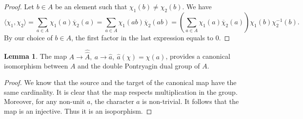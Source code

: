 \documentclass[11pt]{amsart}
\theoremstyle{definition}
\newtheorem{lem}[defi]{Lemma}
\begin{document}
\begin{proof}
    Let $b\in A$ be an element such that $\chi_1(b)\ne\chi_2(b)$. We have
    $$\langle \chi_1,\chi_2\rangle=\sum_{a\in A}\chi_1(a)\overline \chi_2(a)=
    \sum_{a\in A}\chi_1(ab)\overline \chi_2(ab)=(\sum_{a\in A}\chi_1(a)\overline \chi_2(a))\chi_1(b)\chi_2^{-1}(b). 
    $$
    By our choice of $b\in A$, the first factor in the last expression equals to $0$.
\end{proof}
\begin{lem}
The map $A\to \hat{\hat{A}},\ a\to \hat{a},\ \hat{a}(\chi)=\chi(a)$, provides a canonical isomorphism between $A$ and the double Pontryagin dual group of $A$.
\end{lem}
\begin{proof}
    We know that the source and the target of the canonical map have the same cardinality. It is clear that the map respects multiplication in the group. Moreover, for any non-unit $a$, the character $\hat{a}$ is non-trivial. It follows that the map is an injective. Thus it is an isoporphism.
\end{proof}
\end{document}
